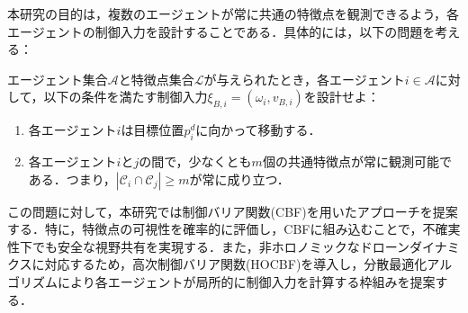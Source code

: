 本研究の目的は，複数のエージェントが常に共通の特徴点を観測できるよう，各エージェントの制御入力を設計することである．具体的には，以下の問題を考える：

\begin{dfn}[共有視野保証問題]
エージェント集合$\mathcal{A}$と特徴点集合$\mathcal{L}$が与えられたとき，各エージェント$i \in \mathcal{A}$に対して，以下の条件を満たす制御入力$\xi_{B,i} = (\omega_i, v_{B,i})$を設計せよ：
\begin{enumerate}
\item 各エージェント$i$は目標位置$p_i^d$に向かって移動する．
\item 各エージェント$i$と$j$の間で，少なくとも$m$個の共通特徴点が常に観測可能である．つまり，$|\mathcal{C}_i \cap \mathcal{C}_j| \geq m$が常に成り立つ．
\end{enumerate}
\end{dfn}

この問題に対して，本研究では制御バリア関数(CBF)を用いたアプローチを提案する．特に，特徴点の可視性を確率的に評価し，CBFに組み込むことで，不確実性下でも安全な視野共有を実現する．また，非ホロノミックなドローンダイナミクスに対応するため，高次制御バリア関数(HOCBF)を導入し，分散最適化アルゴリズムにより各エージェントが局所的に制御入力を計算する枠組みを提案する．
